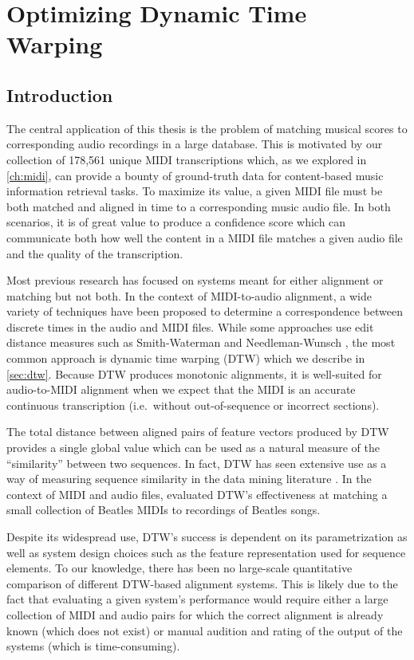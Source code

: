 \chapter{Optimizing Dynamic Time Warping}
\label{ch:dtw}

\section{Introduction}
\label{sec:intro}

The central application of this thesis is the problem of matching musical scores to corresponding audio recordings in a large database.
This is motivated by our collection of 178,561 unique MIDI transcriptions which, as we explored in \cref{ch:midi}, can provide a bounty of ground-truth data for content-based music information retrieval tasks.
To maximize its value, a given MIDI file must be both matched and aligned in time to a corresponding music audio file.
In both scenarios, it is of great value to produce a confidence score which can communicate both how well the content in a MIDI file matches a given audio file and the quality of the transcription.

Most previous research has focused on systems meant for either alignment or matching but not both.
In the context of MIDI-to-audio alignment, a wide variety of techniques have been proposed to determine a correspondence between discrete times in the audio and MIDI files.
While some approaches use edit distance measures such as Smith-Waterman \cite{ewert2012towards} and Needleman-Wunsch \cite{grachten2013automatic}, the most common approach is dynamic time warping (DTW) which we describe in \cref{sec:dtw}.
Because DTW produces monotonic alignments, it is well-suited for audio-to-MIDI alignment when we expect that the MIDI is an accurate continuous transcription (i.e.\ without out-of-sequence or incorrect sections).

The total distance between aligned pairs of feature vectors produced by DTW provides a single global value which can be used as a natural measure of the ``similarity'' between two sequences.
In fact, DTW has seen extensive use as a way of measuring sequence similarity in the data mining literature \cite{berndt1994using}.
In the context of MIDI and audio files, \cite{hu2003polyphonic} evaluated DTW's effectiveness at matching a small collection of Beatles MIDIs to recordings of Beatles songs.

Despite its widespread use, DTW's success is dependent on its parametrization as well as system design choices such as the feature representation used for sequence elements.
To our knowledge, there has been no large-scale quantitative comparison of different DTW-based alignment systems.
This is likely due to the fact that evaluating a given system's performance would require either a large collection of MIDI and audio pairs for which the correct alignment is already known (which does not exist) or manual audition and rating of the output of the systems (which is time-consuming).


